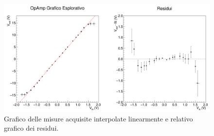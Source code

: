 \documentclass[a4paper,11pt]{article} %
\begin{document}
%		
%		
%		

\begin{figure}[H]
	\centering
	\includegraphics[width=15cm]{../Plots/Report_Plots/opamp_plot_alldata_eda.png}
	\caption{\small Grafico delle misure acquisite interpolate linearmente e relativo grafico dei residui.}
	\label{i:opamp_eda}
\end{figure}
\end{document}
